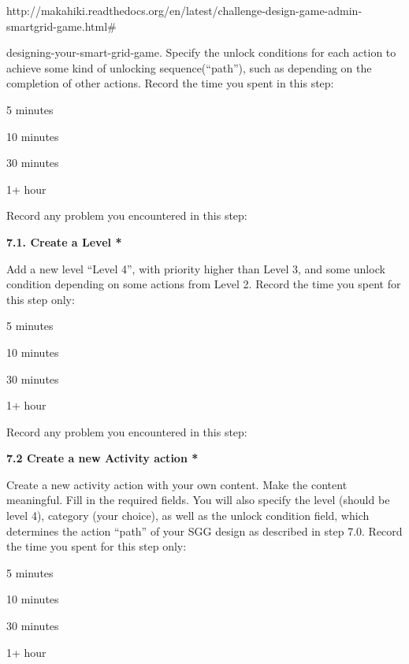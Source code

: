 http://makahiki.readthedocs.org/en/latest/challenge-design-game-admin-smartgrid-game.html\#

designing-your-smart-grid-game. Specify the unlock conditions for each action to achieve some kind of unlocking sequence(``path''), such as depending on the completion of other actions. Record the time you spent in this step:

\begin{radiobutton}
\item 5 minutes
\item  10 minutes
\item  30 minutes
\item  1+ hour
\end{radiobutton}


Record any problem you encountered in this step: \underline{\hspace{4cm}}

{\bf 7.1. Create a Level *}

Add a new level ``Level 4'', with priority higher than Level 3, and some unlock condition depending on some actions from Level 2. Record the time you spent for this step only:

\begin{radiobutton}
\item 5 minutes
\item  10 minutes
\item  30 minutes
\item  1+ hour
\end{radiobutton}


Record any problem you encountered in this step: \underline{\hspace{4cm}}

{\bf 7.2 Create a new Activity action *}

Create a new activity action with your own content. Make the content meaningful. Fill in the required fields. You will also specify the level (should be level 4), category (your choice), as well as the unlock condition field, which determines the action ``path'' of your SGG design as described in step 7.0. Record the time you spent for this step only:

\begin{radiobutton}
\item 5 minutes
\item  10 minutes
\item  30 minutes
\item  1+ hour
\end{radiobutton}

